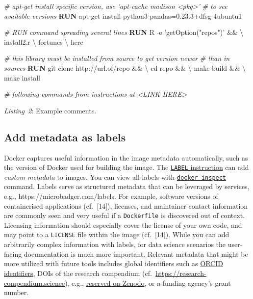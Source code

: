 \documentclass[10pt,letterpaper]{article}
\newenvironment{Shaded}{\begin{snugshade}}{\end{snugshade}}
\newcommand{\CommentTok}[1]{\textcolor[rgb]{0.56,0.35,0.01}{\textit{#1}}}
\newcommand{\KeywordTok}[1]{\textcolor[rgb]{0.13,0.29,0.53}{\textbf{#1}}}
\newcommand{\NormalTok}[1]{#1}
\newcommand{\StringTok}[1]{\textcolor[rgb]{0.31,0.60,0.02}{#1}}
\begin{document}
\begin{Shaded}
\begin{Highlighting}[]
\CommentTok{# apt-get install specific version, use 'apt-cache madison <pkg>' }
\CommentTok{# to see available versions}
\KeywordTok{RUN}\NormalTok{ apt-get install python3-pandas=0.23.3+dfsg-4ubuntu1}

\CommentTok{# RUN command spreading several lines}
\KeywordTok{RUN}\NormalTok{ R -e }\StringTok{'getOption("repos")'}\NormalTok{ && \textbackslash{}}
\NormalTok{  install2.r \textbackslash{}}
\NormalTok{    fortunes \textbackslash{}}
\NormalTok{    here}

\CommentTok{# this library must be installed from source to get version newer}
\CommentTok{# than in sources}
\KeywordTok{RUN}\NormalTok{ git clone http://url.of/repo && \textbackslash{}}
\NormalTok{  cd repo && \textbackslash{}}
\NormalTok{  make build && \textbackslash{}}
\NormalTok{  make install}

\CommentTok{# following commands from instructions at <LINK HERE>}
\end{Highlighting}
\end{Shaded}

\normalsize

\emph{Listing~2}: Example comments.

\hypertarget{add-metadata-as-labels}{%
\subsection{Add metadata as labels}\label{add-metadata-as-labels}}

Docker captures useful information in the image metadata automatically,
such as the version of Docker used for building the image. The
\href{https://docs.docker.com/engine/reference/builder/\#label}{\texttt{LABEL}
instruction} can add \emph{custom metadata} to images. You can view all
labels with
\href{https://docs.docker.com/engine/reference/commandline/inspect/}{\texttt{docker\ inspect}}
command. Labels serve as structured metadata that can be leveraged by
services, e.g., https://microbadger.com/labels. For example, software
versions of containerised applications (cf.~{[}14{]}), licenses, and
maintainer contact information are commonly seen and very useful if a
\texttt{Dockerfile} is discovered out of context. Licensing information
should especially cover the license of your own code, and may point to a
\texttt{LICENSE} file within the image (cf.~{[}14{]}). While you can add
arbitrarily complex information with labels, for data science scenarios
the user-facing documentation is much more important. Relevant metadata
that might be more utilized with future tools includes global
identifiers such as \href{https://orcid.org/}{ORCID identifiers}, DOIs
of the research compendium
(cf.~\url{https://research-compendium.science}), e.g.,
\href{https://help.zenodo.org/}{reserved on Zenodo}, or a funding
agency's grant number.
\end{document}
